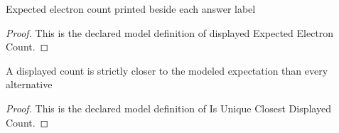 \begin{definition}
  \label{def:physics:phyx-mini-0501:phyxminiproblems-problemphyxmini0501-displayedexpectedelectroncount}
  Expected electron count printed beside each answer label
\end{definition}
\begin{proof}
  This is the declared model definition of displayed Expected Electron Count.
\end{proof}
\begin{definition}
  \label{def:physics:phyx-mini-0501:phyxminiproblems-problemphyxmini0501-isuniqueclosestdisplayedcount}
  A displayed count is strictly closer to the modeled expectation than every alternative
\end{definition}
\begin{proof}
  This is the declared model definition of Is Unique Closest Displayed Count.
\end{proof}
